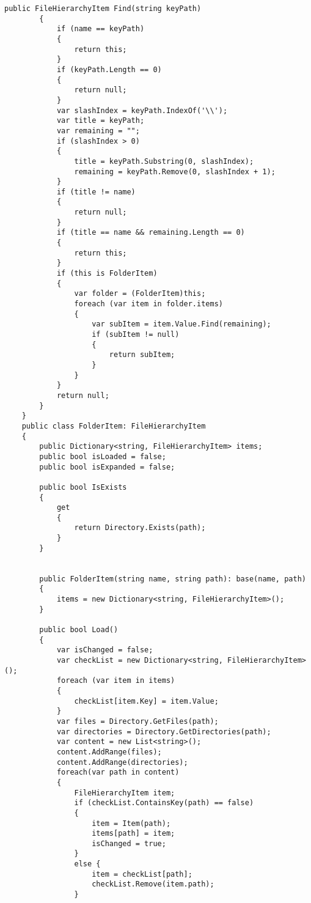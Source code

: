 \documentclass{scrartcl}
\begin{document}
\begin{lstlisting}[language={[Sharp]C}, caption={IDE}, label={experiment}]
        public FileHierarchyItem Find(string keyPath)
        {
            if (name == keyPath)
            {
                return this;
            }
            if (keyPath.Length == 0)
            {
                return null;
            }
            var slashIndex = keyPath.IndexOf('\\');
            var title = keyPath;
            var remaining = "";
            if (slashIndex > 0)
            {
                title = keyPath.Substring(0, slashIndex);
                remaining = keyPath.Remove(0, slashIndex + 1);
            }
            if (title != name)
            {
                return null;
            }
            if (title == name && remaining.Length == 0)
            {
                return this;
            }
            if (this is FolderItem)
            {
                var folder = (FolderItem)this;
                foreach (var item in folder.items)
                {
                    var subItem = item.Value.Find(remaining);
                    if (subItem != null)
                    {
                        return subItem;
                    }
                }
            }
            return null;
        }
    }
    public class FolderItem: FileHierarchyItem
    {
        public Dictionary<string, FileHierarchyItem> items;
        public bool isLoaded = false;
        public bool isExpanded = false;

        public bool IsExists
        {
            get
            {
                return Directory.Exists(path);
            }
        }


        public FolderItem(string name, string path): base(name, path)
        {
            items = new Dictionary<string, FileHierarchyItem>();
        }

        public bool Load()
        {
            var isChanged = false;
            var checkList = new Dictionary<string, FileHierarchyItem>();
            foreach (var item in items)
            {
                checkList[item.Key] = item.Value;
            }
            var files = Directory.GetFiles(path);
            var directories = Directory.GetDirectories(path);
            var content = new List<string>();
            content.AddRange(files);
            content.AddRange(directories);
            foreach(var path in content)
            {
                FileHierarchyItem item;
                if (checkList.ContainsKey(path) == false)
                {
                    item = Item(path);
                    items[path] = item;
                    isChanged = true;
                }
                else {
                    item = checkList[path];
                    checkList.Remove(item.path);
                }


\end{lstlisting}
\end{document}
